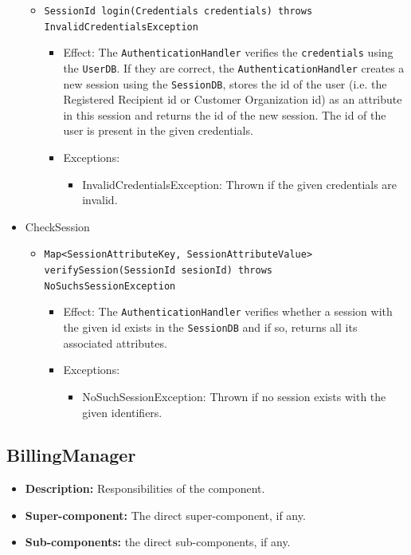 \documentclass[a4paper,10pt]{article}
\begin{document}
\begin{itemize}
\begin{itemize}
        \item \texttt{SessionId login(Credentials credentials) throws InvalidCredentialsException}
        \begin{itemize}
            \item Effect: The \texttt{AuthenticationHandler} verifies the \texttt{credentials} using the \texttt{UserDB}. If they are correct, the \texttt{AuthenticationHandler} creates a new session using the \texttt{SessionDB}, stores the id of the user (i.e. the Registered Recipient id or Customer Organization id) as an attribute in this session and returns the id of the new session. The id of the user is present in the given credentials.
            \item Exceptions: 
            \begin{itemize}
                \item InvalidCredentialsException: Thrown if the given credentials are invalid.
             \end{itemize}
        \end{itemize}
    \end{itemize}
    
    
	\item CheckSession
    \begin{itemize}
        \item \texttt{Map<SessionAttributeKey, SessionAttributeValue> verifySession(SessionId sesionId) throws NoSuchsSessionException}
        \begin{itemize}
            \item Effect: The \texttt{AuthenticationHandler} verifies whether a session with the given id exists in the \texttt{SessionDB} and if so, returns all its associated attributes.
            \item Exceptions:
            \begin{itemize}
                \item NoSuchSessionException: Thrown if no session exists with the given identifiers.
             \end{itemize}
        \end{itemize}
    \end{itemize}	
\end{itemize}

\subsection{BillingManager}
\begin{itemize}
    \item \textbf{Description:} Responsibilities of the component.
    \item \textbf{Super-component:} The direct super-component, if any.
    \item \textbf{Sub-components:} the direct sub-components, if any.
\end{itemize}
\end{document}
